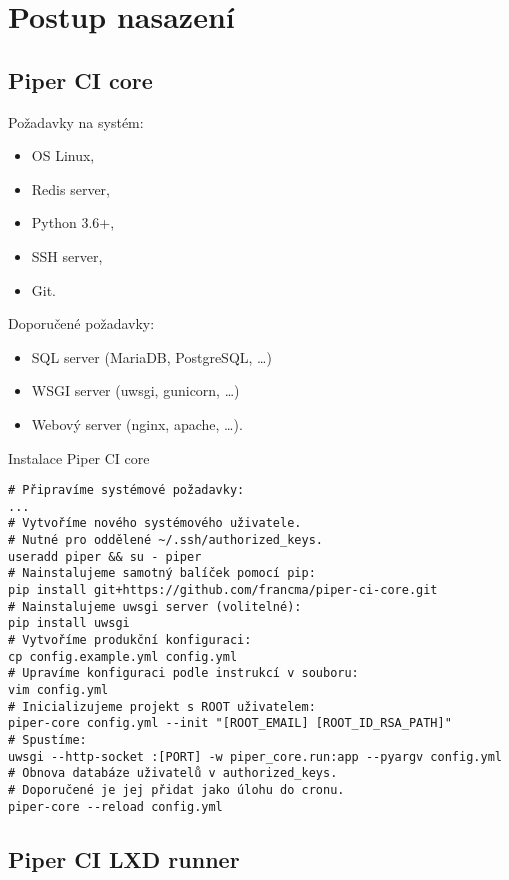 \clearpage\section{Postup nasazení}

\subsection{Piper CI core}

Požadavky na systém:

\begin{itemize}
	\item OS Linux,
	\item Redis server,
	\item Python 3.6+,
	\item SSH server,
	\item Git.
\end{itemize}

Doporučené požadavky:

\begin{itemize}
	\item SQL server (MariaDB, PostgreSQL, \ldots)
	\item WSGI server (uwsgi, gunicorn, \ldots)
	\item Webový server (nginx, apache, \ldots).
\end{itemize}

\begin{listing}[H]
\caption{Instalace Piper CI core}
\begin{verbatim}
# Připravíme systémové požadavky:
...
# Vytvoříme nového systémového uživatele.
# Nutné pro oddělené ~/.ssh/authorized_keys.
useradd piper && su - piper
# Nainstalujeme samotný balíček pomocí pip:
pip install git+https://github.com/francma/piper-ci-core.git
# Nainstalujeme uwsgi server (volitelné):
pip install uwsgi
# Vytvoříme produkční konfiguraci:
cp config.example.yml config.yml
# Upravíme konfiguraci podle instrukcí v souboru:
vim config.yml
# Inicializujeme projekt s ROOT uživatelem:
piper-core config.yml --init "[ROOT_EMAIL] [ROOT_ID_RSA_PATH]"
# Spustíme:
uwsgi --http-socket :[PORT] -w piper_core.run:app --pyargv config.yml
# Obnova databáze uživatelů v authorized_keys.
# Doporučené je jej přidat jako úlohu do cronu.
piper-core --reload config.yml
\end{verbatim}
\end{listing}

\subsection{Piper CI LXD runner}

